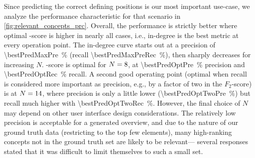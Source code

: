 
Since predicting the correct defining positions is our most important use-case,
we analyze the performance characteristic for that scenario in \autoref{fig:relevant_concepts_prc}.
Overall, 
the performance is strictly better where optimal \fOne-score is higher in nearly all cases,
i.e., in-degree is the best metric at every operation point.
The in-degree curve starts out at a precision of \SI[round-mode=places,round-precision=1]{\bestPredMaxPre}{\percent} (recall \SI[round-mode=places,round-precision=1]{\bestPredMaxPreRec}{\percent}), then sharply decreases for increasing $N$.
\fOne-score is optimal for $N=8$, at \SI[round-mode=places,round-precision=1]{\bestPredOptPre}{\percent} precision and \SI[round-mode=places,round-precision=1]{\bestPredOptRec}{\percent} recall.
A second good operating point
(optimal when recall is considered more important as precision, e.g., by a factor of two in the $F_2$-score)
is at $N=14$,
where precision is only a little lower (\SI[round-mode=places,round-precision=1]{\bestPredOptTwoPre}{\percent}) but recall much higher with \SI[round-mode=places,round-precision=1]{\bestPredOptTwoRec}{\percent}.
However, the final choice of $N$ may depend on other user interface design considerations.
The relatively low precision is acceptable for a generated overview,
and due to the nature of our ground truth data (restricting to the top few elements),
many high-ranking concepts not in the ground truth set are likely to be relevant---%
several responses stated that it was difficult to limit themselves to such a small set.
